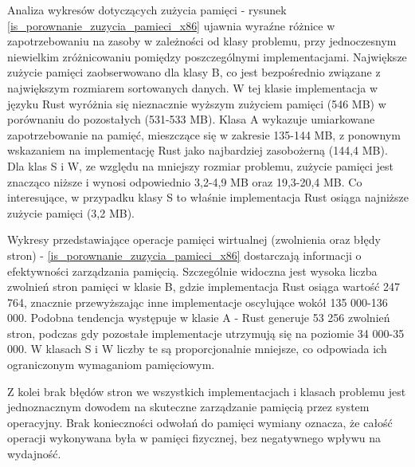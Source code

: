 Analiza wykresów dotyczących zużycia pamięci - rysunek \ref{is_porownanie_zuzycia_pamieci_x86} ujawnia wyraźne różnice w zapotrzebowaniu na zasoby w zależności od klasy problemu, przy jednoczesnym niewielkim zróżnicowaniu pomiędzy poszczególnymi implementacjami. Największe zużycie pamięci zaobserwowano dla klasy B, co jest bezpośrednio związane z największym rozmiarem sortowanych danych. W tej klasie implementacja w języku Rust wyróżnia się nieznacznie wyższym zużyciem pamięci (546 MB) w porównaniu do pozostałych (531-533 MB). Klasa A wykazuje umiarkowane zapotrzebowanie na pamięć, mieszczące się w zakresie 135-144 MB, z ponownym wskazaniem na implementację Rust jako najbardziej zasobożerną (144,4 MB). Dla klas S i W, ze względu na mniejszy rozmiar problemu, zużycie pamięci jest znacząco niższe i wynosi odpowiednio 3,2-4,9 MB oraz 19,3-20,4 MB. Co interesujące, w przypadku klasy S to właśnie implementacja Rust osiąga najniższe zużycie pamięci (3,2 MB).

Wykresy przedstawiające operacje pamięci wirtualnej (zwolnienia oraz błędy stron) - \ref{is_porownanie_zuzycia_pamieci_x86} dostarczają informacji o efektywności zarządzania pamięcią. Szczególnie widoczna jest wysoka liczba zwolnień stron pamięci w klasie B, gdzie implementacja Rust osiąga wartość 247 764, znacznie przewyższając inne implementacje oscylujące wokół 135 000-136 000. Podobna tendencja występuje w klasie A - Rust generuje 53 256 zwolnień stron, podczas gdy pozostałe implementacje utrzymują się na poziomie 34 000-35 000. W klasach S i W liczby te są proporcjonalnie mniejsze, co odpowiada ich ograniczonym wymaganiom pamięciowym.

Z kolei brak błędów stron we wszystkich implementacjach i klasach problemu jest jednoznacznym dowodem na skuteczne zarządzanie pamięcią przez system operacyjny. Brak konieczności odwołań do pamięci wymiany oznacza, że całość operacji wykonywana była w pamięci fizycznej, bez negatywnego wpływu na wydajność.


